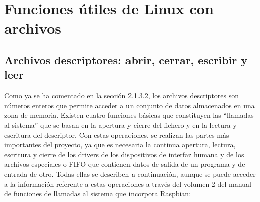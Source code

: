 








\section{Funciones útiles de Linux con archivos} \label{s2_7}

\subsection{Archivos descriptores: abrir, cerrar, escribir y leer} \label{s2_7_1}

Como ya se ha comentado en la sección 2.1.3.2, los archivos descriptores son números enteros que permite acceder a un conjunto de datos almacenados en una zona de memoria. Existen cuatro funciones básicas que constituyen las ``llamadas al sistema'' que se basan en la apertura y cierre del fichero y en la lectura y escritura del descriptor. Con estas operaciones, se realizan las partes más importantes del proyecto, ya que es necesaria la continua apertura, lectura, escritura y cierre de los drivers de los dispositivos de interfaz humana y de los archivos especiales o FIFO que contienen datos de salida de un programa y de entrada de otro. Todas ellas se describen a continuación, aunque se puede acceder a la información referente a estas operaciones a través del volumen 2 del manual de funciones de llamadas al sistema que incorpora Raspbian:

